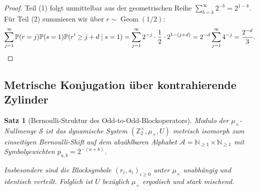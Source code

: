\documentclass[11pt,reqno]{amsart}
\newtheorem{theorem}{Satz}[section]
\theoremstyle{definition}
\theoremstyle{remark}
\numberwithin{equation}{section}
\begin{document}
\begin{proof}
Teil (1) folgt unmittelbar aus der geometrischen Reihe $\sum_{b=k}^\infty 2^{-b} = 2^{1-k}$. 
F\"ur Teil (2) summieren wir \"uber $r \sim \operatorname{Geom}(1/2)$:
\begin{equation*}
\sum_{j=1}^\infty \mathbb{P}(r=j)\mathbb{P}(s=1)\mathbb{P}(r' \ge j+d \mid s=1) = \sum_{j=1}^\infty 2^{-j} \cdot \frac{1}{2} \cdot 2^{1-(j+d)} = 2^{-d} \sum_{j=1}^\infty 4^{-j} = \frac{2^{-d}}{3}. \qedhere
\end{equation*}
\end{proof}

\subsection{Metrische Konjugation \"uber kontrahierende Zylinder}

\begin{theorem}[Bernoulli-Struktur des Odd-to-Odd-Blockoperators]
\label{thm:block_bernoulli}
Modulo der $\mu_\times$-Nullmenge $\mathcal{S}$ ist das dynamische System $(\mathbb{Z}_2^\times, \mu_\times, U)$ metrisch isomorph zum einseitigen Bernoulli-Shift auf dem abz\"ahlbaren Alphabet $\mathcal{A} = \mathbb{N}_{\ge1} \times \mathbb{N}_{\ge1}$ mit Symbolgewichten $p_{a,b} = 2^{-(a+b)}$.

Insbesondere sind die Blocksymbole $(r_i, s_i)_{i \ge 0}$ unter $\mu_\times$ unabh\"angig und identisch verteilt. Folglich ist $U$ bez\"uglich $\mu_\times$ ergodisch und stark mischend.
\end{theorem}
\end{document}
